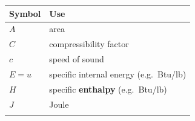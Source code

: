 \documentclass[
]{book}
\begin{document}
\begin{longtable}[]{@{}ll@{}}
\toprule
\begin{minipage}[b]{0.58\columnwidth}\raggedright
Symbol\strut
\end{minipage} & \begin{minipage}[b]{0.36\columnwidth}\raggedright
Use\strut
\end{minipage}\tabularnewline
\midrule
\endhead
\begin{minipage}[t]{0.58\columnwidth}\raggedright
\(A\)\strut
\end{minipage} & \begin{minipage}[t]{0.36\columnwidth}\raggedright
area\strut
\end{minipage}\tabularnewline
\begin{minipage}[t]{0.58\columnwidth}\raggedright
\(C\)\strut
\end{minipage} & \begin{minipage}[t]{0.36\columnwidth}\raggedright
compressibility factor\strut
\end{minipage}\tabularnewline
\begin{minipage}[t]{0.58\columnwidth}\raggedright
\(c\)\strut
\end{minipage} & \begin{minipage}[t]{0.36\columnwidth}\raggedright
speed of sound\strut
\end{minipage}\tabularnewline
\begin{minipage}[t]{0.58\columnwidth}\raggedright
\(E = u\)\strut
\end{minipage} & \begin{minipage}[t]{0.36\columnwidth}\raggedright
specific internal energy (e.g.~Btu/lb)\strut
\end{minipage}\tabularnewline
\begin{minipage}[t]{0.58\columnwidth}\raggedright
\(H\)\strut
\end{minipage} & \begin{minipage}[t]{0.36\columnwidth}\raggedright
specific \textbf{enthalpy} (e.g.~Btu/lb)\strut
\end{minipage}\tabularnewline
\begin{minipage}[t]{0.58\columnwidth}\raggedright
\(J\)\strut
\end{minipage} & \begin{minipage}[t]{0.36\columnwidth}\raggedright
Joule\strut
\end{minipage}\tabularnewline
\begin{minipage}[t]{0.58\columnwidth}\raggedright

\end{minipage}
\end{longtable}
\end{document}
